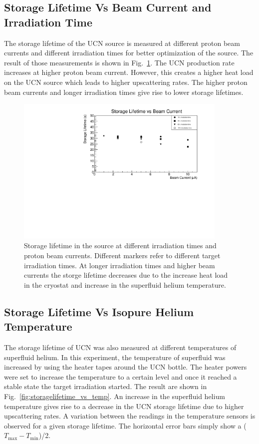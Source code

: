\subsection{Storage Lifetime Vs Beam Current and Irradiation Time}
The storage lifetime of the UCN source is measured at different proton
beam currents and different irradiation times for better
optimization of the source. The result of those measurements is shown in
Fig.~\ref{fig:storage_beam_irrad}. The UCN production rate increases
at higher proton beam current. However, this creates a higher heat
load on the UCN source which leads to higher upscattering rates. The
higher proton beam currents and longer irradiation times give rise to
lower storage lifetimes.

\begin{figure}[h!]
  \centering
  \includegraphics[width=0.9\textwidth]{StorageLifetime_17009_and_17009A.pdf}
  \caption{Storage lifetime in the source at different irradiation
    times and proton beam currents. Different markers refer to
    different target irradiation times. At longer irradiation times
    and higher beam currents the storge lifetime decreases due to the
    increase heat load in the cryostat and increase in the superfluid
    helium temperature. }
  \label{fig:storage_beam_irrad}
\end{figure}



\subsection{Storage Lifetime Vs Isopure Helium Temperature}
The storage lifetime of UCN was also measured at different
temperatures of superfluid helium. In this experiment, the temperature
of superfluid was increased by using the heater tapes around the UCN
bottle. The heater powers were set to increase the temperature to a
certain level and once it reached a stable state the target
irradiation started. The result are shown in
Fig.~\ref{fig:storagelifetime_vs_temp}. An increase in the superfluid
helium temperature gives rise to a decrease in the UCN storage
lifetime due to higher upscattering rates. A variation between the
readings in the temperature sensors is observed for a given storage
lifetime. The horizontal error bars simply show a
($T_{\mathrm{max}} - T_{\mathrm{min}}$)/2.

